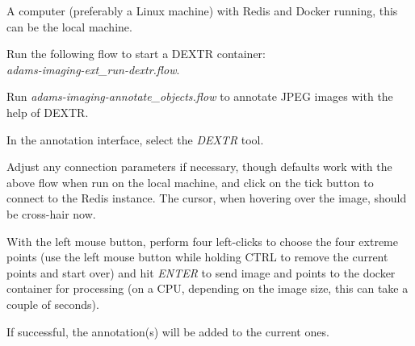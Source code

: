 \documentclass[a4paper]{book}
\begin{document}
\begin{tight_itemize}
  \item A computer (preferably a Linux machine) with Redis\cite{redis} and Docker\cite{docker} running,
  this can be the local machine.
  \item Run the following flow to start a DEXTR container: \\
  \textit{adams-imaging-ext\_run-dextr.flow}.
  \item Run \textit{adams-imaging-annotate\_objects.flow} to annotate JPEG images with the help of DEXTR.
  \begin{tight_itemize}
    \item In the annotation interface, select the \textit{DEXTR} tool.
    \item Adjust any connection parameters if necessary, though defaults work with the above flow when run on the
    local machine, and click on the tick button to connect to the Redis instance. The cursor, when hovering over
    the image, should be cross-hair now.
    \item With the left mouse button, perform four left-clicks to choose the four extreme points (use the left mouse
    button while holding CTRL to remove the current points and start over) and hit \textit{ENTER} to send image and
    points to the docker container for processing (on a CPU, depending on the image size, this can take a couple of seconds).
    \item If successful, the annotation(s) will be added to the current ones.
  \end{tight_itemize}
\end{tight_itemize}



\end{document}
